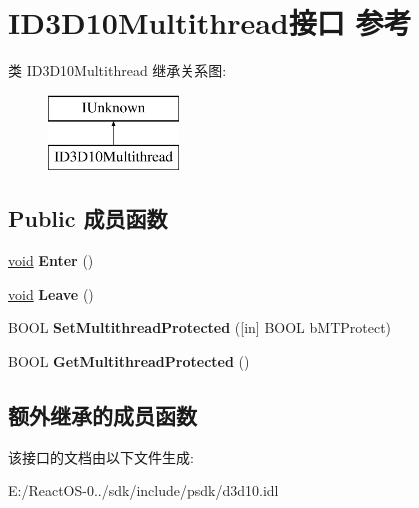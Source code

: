 \hypertarget{interface_i_d3_d10_multithread}{}\section{I\+D3\+D10\+Multithread接口 参考}
\label{interface_i_d3_d10_multithread}
类 I\+D3\+D10\+Multithread 继承关系图\+:\begin{figure}[H]
\begin{center}
\leavevmode
\includegraphics[height=2.000000cm]{interface_i_d3_d10_multithread}
\end{center}
\end{figure}
\subsection*{Public 成员函数}
\begin{DoxyCompactItemize}
\item 
\mbox{\label{interface_i_d3_d10_multithread_a211d86dc27d072c30394d9531ab21426}} 
\hyperlink{interfacevoid}{void} {\bfseries Enter} ()
\item 
\mbox{\label{interface_i_d3_d10_multithread_a62a1ca2873573e4668a37dacedbf5e78}} 
\hyperlink{interfacevoid}{void} {\bfseries Leave} ()
\item 
\mbox{\label{interface_i_d3_d10_multithread_a87cebba07ba012f18bf9ebcb14424b13}} 
B\+O\+OL {\bfseries Set\+Multithread\+Protected} (\mbox{[}in\mbox{]} B\+O\+OL b\+M\+T\+Protect)
\item 
\mbox{\label{interface_i_d3_d10_multithread_ad951197f2128ea02debc424efafb2b05}} 
B\+O\+OL {\bfseries Get\+Multithread\+Protected} ()
\end{DoxyCompactItemize}
\subsection*{额外继承的成员函数}


该接口的文档由以下文件生成\+:\begin{DoxyCompactItemize}
\item 
E\+:/\+React\+O\+S-\/0../sdk/include/psdk/d3d10.\+idl\end{DoxyCompactItemize}
